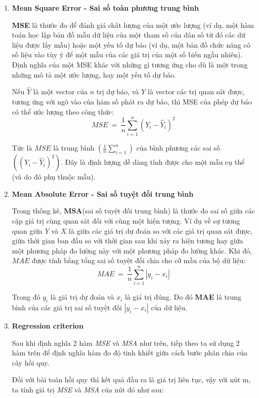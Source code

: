 \documentclass[../main-report.tex]{subfiles}
\begin{document}
\begin{enumerate}
\item \textbf{Mean Square Error - Sai số toàn phương trung bình}

\textbf{MSE} là thước đo để đánh giá chất lượng của một ước lượng (ví dụ, một hàm toán học lập bản đồ mẫu dữ liệu của một tham số của dân số từ đó các dữ liệu được lấy mẫu) hoặc một yếu tố dự báo (ví dụ, một bản đồ chức năng có số liệu vào tùy ý để một mẫu của các giá trị của một số biến ngẫu nhiên). Định nghĩa của một MSE khác với những gì tương ứng cho dù là một trong những mô tả một ước lượng, hay một yếu tố dự báo.

Nếu ${\hat {Y}}$ là một vector của $n$ trị dự báo, và $Y$ là vector các trị quan sát được, tương ứng với ngõ vào của hàm số phát ra dự báo, thì MSE của phép dự báo có thể ước lượng theo công thức:
$$MSE\:=\:\frac{1}{n}\sum^{n}_{i=1}(Y_{i} - \hat{Y}_{i})^{2}$$

Tức là $MSE$ là trung bình $(\frac{1}{n}\sum^{n}_{i=1})$ của bình phương các sai số $((Y_{i} - \hat{Y}_{i})^{2})$. Đây là định lượng dễ dàng tính được cho một mẫu cụ thể (và do đó phụ thuộc mẫu).

\item \textbf{Mean Absolute Error - Sai số tuyệt đối trung bình}

Trong thống kê, \textbf{MSA}(sai số tuyệt đối trung bình) là thước đo sai số giữa các cặp giá trị cùng quan sát đối với cùng một hiện tượng. Ví dụ về sự tương quan giữa $Y$ và $X$ là giữa các giá trị dự đoán so với các giá trị quan sát được, giữa thời gian ban đầu so với thời gian sau khi xảy ra hiện tương hay giữa một phương pháp đo lường này với một phương pháp đo lường khác. Khi đó, $MAE$ được tính bằng tổng sai số tuyệt đối chia cho cỡ mẫu của bộ dữ liệu:
$$MAE\:=\:\frac{1}{n}\sum^{n}_{i=1}|y_{i} - x_{i}|$$

Trong đó $y_{i}$ là giá trị dự đoán và $x_{i}$ là giá trị đúng. Do đó \textbf{MAE} là trung bình của các giá trị sai số tuyệt đối $|y_{i} - x_{i}|$ của dữ liệu.

\item \textbf{Regression criterion}

Sau khi định nghĩa 2 hàm \textit{MSE} và \textit{MSA} như trên, tiếp theo ta sử dụng 2 hàm trên để định nghĩa hàm đo độ tinh khiết giữa cách bước phân chia của cây hồi quy.

Đối với bài toán hồi quy thì kết quả đầu ra là giá trị liên tục, vậy với nút m, ta tính giá trị \textit{MSE} và \textit{MSA} của nút đó như sau:


\end{enumerate}
\end{document}
